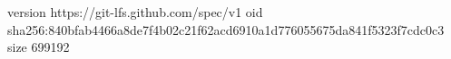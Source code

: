 version https://git-lfs.github.com/spec/v1
oid sha256:840bfab4466a8de7f4b02c21f62acd6910a1d776055675da841f5323f7cdc0c3
size 699192

